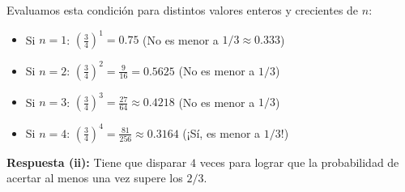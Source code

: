 \documentclass[11pt, a4paper]{article}
\begin{document}
Evaluamos esta condición para distintos valores enteros y crecientes de $n$:
\begin{itemize}
    \item Si $n = 1$: $\left(\frac{3}{4}\right)^1 = 0.75$ (No es menor a $1/3 \approx 0.333$)
    \item Si $n = 2$: $\left(\frac{3}{4}\right)^2 = \frac{9}{16} = 0.5625$ (No es menor a $1/3$)
    \item Si $n = 3$: $\left(\frac{3}{4}\right)^3 = \frac{27}{64} \approx 0.4218$ (No es menor a $1/3$)
    \item Si $n = 4$: $\left(\frac{3}{4}\right)^4 = \frac{81}{256} \approx 0.3164$ (¡Sí, es menor a $1/3$!)
\end{itemize}

\textbf{Respuesta (ii):} Tiene que disparar $4$ veces para lograr que la probabilidad de acertar al menos una vez supere los $2/3$.
\end{document}
